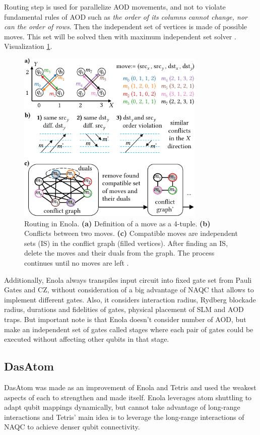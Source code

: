 Routing step is used for parallelize \ac{AOD} movements, 
and not to violate fundamental rules of \ac{AOD} such as \textit{the order of its columns cannot change, nor can
the order of rows}.
Then the independent set of vertices is made of possible moves. 
This set will be solved then with maximum independent set solver \parencite{Tan_2025_Enola}.
Visualization \ref{fig:routing_Enola}.
\begin{figure}[htbp]
  \centering
    \includegraphics[width=0.8\textwidth]{figures/routing_Enola.pdf}
    \caption[Routing in Enola]{Routing in Enola. 
    \textbf{(a)} Definition of a move as a 4-tuple. 
    \textbf{(b)} Conflicts between two moves. 
    \textbf{(c)} Compatible moves are independent sets (IS) in the conflict graph (filled vertices).
    After finding an IS, delete the moves and their duals from
    the graph. The process continues until no moves are left \parencite{Tan_2025_Enola}.}
    \label{fig:routing_Enola}
\end{figure}

Additionally, Enola always transpiles input circuit into fixed gate set from Pauli Gates and CZ, 
without consideration of a big advantage of \ac{NAQC} that allows to implement different gates.
Also, it considers interaction radius, Rydberg blockade radius, durations and fidelities of gates,
physical placement of \ac{SLM} and \ac{AOD} traps. 
But important note is that Enola doesn't consider number of \ac{AOD}, 
but make an independent set of gates called stages where each pair of gates could be executed without affecting other qubits in that stage.

\subsection{DasAtom}
DasAtom was made as an improvement of Enola and Tetris 
and used the weakest aspects of each to strengthen and made itself.
Enola leverages atom shuttling to adapt qubit mappings dynamically,
but cannot take advantage of long-range interactions
and Tetris' main idea is to leverage the long-range interactions of \ac{NAQC} 
to achieve denser qubit connectivity\parencite{10082942, huang2025dasatomdivideandshuttleatomapproach}.

